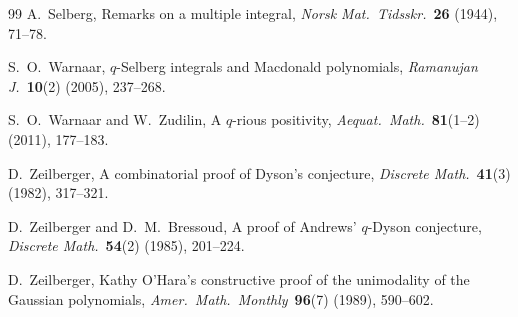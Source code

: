 \documentclass[11pt]{article}
\begin{document}
\begin{thebibliography}{99}
A.~Selberg,
Remarks on a multiple integral,
\emph{Norsk Mat.\ Tidsskr.}\ \textbf{26} (1944), 71--78.

S.~O.~Warnaar,
$q$-Selberg integrals and Macdonald polynomials,
\emph{Ramanujan J.}\ \textbf{10}(2) (2005), 237--268.

S.~O.~Warnaar and W.~Zudilin,
A $q$-rious positivity,
\emph{Aequat.\ Math.}\ \textbf{81}(1--2) (2011), 177--183.

D.~Zeilberger,
A combinatorial proof of Dyson's conjecture,
\emph{Discrete Math.}\ \textbf{41}(3) (1982), 317--321.

D.~Zeilberger and D.~M.~Bressoud,
A proof of Andrews' $q$-Dyson conjecture,
\emph{Discrete Math.}\ \textbf{54}(2) (1985), 201--224.

D.~Zeilberger,
Kathy O'Hara's constructive proof of the unimodality of the
Gaussian polynomials,
\emph{Amer.\ Math.\ Monthly}\ \textbf{96}(7) (1989), 590--602.

\end{thebibliography}
\end{document}
